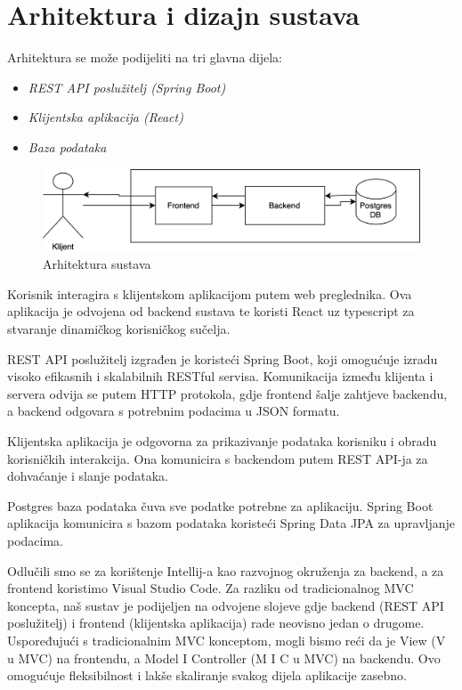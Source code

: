 \chapter{Arhitektura i dizajn sustava}
		
		Arhitektura se može podijeliti na tri glavna dijela:
		
		\begin{itemize}
			\item 	\textit{REST API poslužitelj (Spring Boot)}
			\item 	\textit{Klijentska aplikacija (React)}
			\item 	\textit{Baza podataka}		
		\end{itemize}
		
		\begin{figure}[h]
			\centering
			\includegraphics[width=0.8\linewidth]{./slike/arhitektura_sustava.png} 
			\caption{Arhitektura sustava}
			\label{fig:arh_sustava}
		\end{figure}
		
		
		
		Korisnik interagira s klijentskom aplikacijom putem web preglednika. Ova aplikacija je odvojena od backend sustava te koristi React uz typescript za stvaranje dinamičkog korisničkog sučelja.
		
		REST API poslužitelj izgrađen je koristeći Spring Boot, koji omogućuje izradu visoko efikasnih i skalabilnih RESTful servisa. Komunikacija između klijenta i servera odvija se putem HTTP protokola, gdje frontend šalje zahtjeve backendu, a backend odgovara s potrebnim podacima u JSON formatu.
		
		Klijentska aplikacija je odgovorna za prikazivanje podataka korisniku i obradu korisničkih interakcija. Ona komunicira s backendom putem REST API-ja za dohvaćanje i slanje podataka.
		
		Postgres baza podataka čuva sve podatke potrebne za aplikaciju. Spring Boot aplikacija komunicira s bazom podataka koristeći Spring Data JPA za upravljanje podacima.
		
		Odlučili smo se za korištenje Intellij-a kao razvojnog okruženja za backend, a za frontend koristimo Visual Studio Code.
		Za razliku od tradicionalnog MVC koncepta, naš sustav je podijeljen na odvojene slojeve gdje backend (REST API poslužitelj) i frontend (klijentska aplikacija) rade neovisno jedan o drugome. Uspoređujući s tradicionalnim MVC konceptom, mogli bismo reći da je View (V u MVC) na frontendu, a Model I Controller (M I C u MVC) na backendu. Ovo omogućuje fleksibilnost i lakše skaliranje svakog dijela aplikacije zasebno.
				

